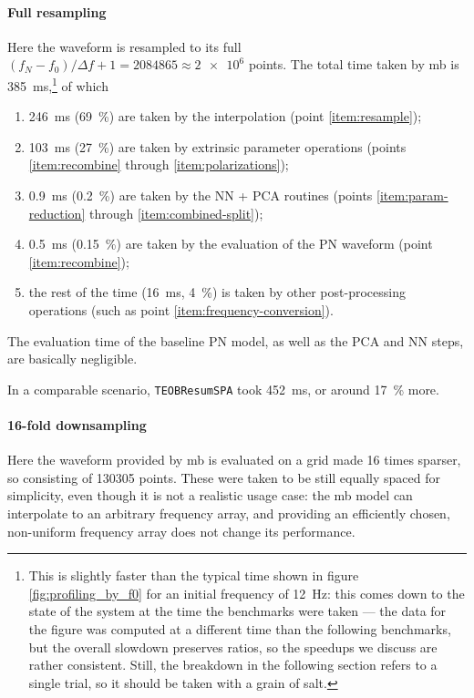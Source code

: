 \documentclass[main.tex]{subfiles}
\begin{document}
\paragraph{Full resampling}
Here the waveform is resampled to its full \((f_N - f_0 ) / \Delta f + 1 = 2084865 \approx \num{2e6}\) points. 
The total time taken by \ac{mb} is \SI{385}{ms},\footnote{This is slightly faster than the typical time shown in figure \ref{fig:profiling_by_f0} for an initial frequency of \SI{12}{Hz}: this comes down to the state of the system at the time the benchmarks were taken --- the data for the figure was computed at a different time than the following benchmarks, but the overall slowdown preserves ratios, so the speedups we discuss are rather consistent.
Still, the breakdown in the following section refers to a single trial, so it should be taken with a grain of salt.} of which 
\begin{enumerate}
    \item \SI{246}{ms} (\SI{69}{\%}) are taken by the interpolation (point \ref{item:resample});
    \item \SI{103}{ms} (\SI{27}{\%}) are taken by extrinsic parameter operations (points \ref{item:recombine} through \ref{item:polarizations});
    \item \SI{0.9}{ms} (\SI{0.2}{\%}) are taken by the \ac{NN} + \ac{PCA} routines (points \ref{item:param-reduction} through \ref{item:combined-split});
    \item \SI{0.5}{ms} (\SI{0.15}{\%}) are taken by the evaluation of the \ac{PN} waveform (point \ref{item:recombine});
    \item the rest of the time (\SI{16}{ms}, \SI{4}{\%}) is taken by other post-processing operations (such as point \ref{item:frequency-conversion}).
\end{enumerate}

The evaluation time of the baseline \ac{PN} model, as well as the \ac{PCA} and \ac{NN} steps, are basically negligible. 

In a comparable scenario, \texttt{TEOBResumSPA} took \SI{452}{ms}, or around \SI{17}{\%} more. 

\paragraph{16-fold downsampling}

Here the waveform provided by \ac{mb} is evaluated on a grid made 16 times sparser, so consisting of 130305 points.
These were taken to be still equally spaced for simplicity, even though it is not a realistic usage case: the \ac{mb} model can interpolate to an arbitrary frequency array, and providing an efficiently chosen, non-uniform frequency array does not change its performance. 
\end{document}

